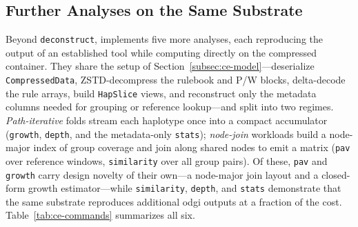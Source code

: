 \subsection{Further Analyses on the Same Substrate}\label{subsec:ce-instances}

Beyond \texttt{deconstruct}, \gfaz implements five more analyses, each reproducing
the output of an established tool while computing directly on the compressed
container. They share the setup of Section~\ref{subsec:ce-model}---deserialize
\texttt{CompressedData}, ZSTD-decompress the rulebook and P/W blocks, delta-decode
the rule arrays, build \texttt{HapSlice} views, and reconstruct only the metadata
columns needed for grouping or reference lookup---and split into two regimes.
\emph{Path-iterative} folds stream each haplotype once into a compact accumulator
(\texttt{growth}, \texttt{depth}, and the metadata-only \texttt{stats});
\emph{node-join} workloads build a node-major index of group coverage and join along
shared nodes to emit a matrix (\texttt{pav} over reference windows,
\texttt{similarity} over all group pairs). Of these, \texttt{pav} and \texttt{growth}
carry design novelty of their own---a node-major join layout and a closed-form growth
estimator---while \texttt{similarity}, \texttt{depth}, and \texttt{stats} demonstrate
that the same substrate reproduces additional odgi outputs at a fraction of the cost.
Table~\ref{tab:ce-commands} summarizes all six.

